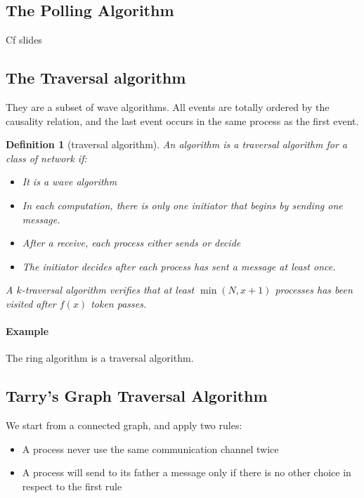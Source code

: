 \documentclass{article}
\newtheorem{defi}{Definition}
\begin{document}
\newpage
\subsection{The Polling Algorithm}
Cf slides


\subsection{The Traversal algorithm}
They are a subset of wave algorithms. All events are totally ordered by the causality relation, and the last event occurs in the same process as the first event.

\begin{defi}[traversal algorithm]
An algorithm is a traversal algorithm for a class of network if:
\begin{itemize}[noitemsep]
\item It is a wave algorithm
\item In each computation, there is only one initiator that begins by sending one message.
\item After a receive, each process either sends or decide
\item The initiator decides after each process has sent a message at least once.
\end{itemize}
A $k$-traversal algorithm verifies that at least $\min(N,x+1)$ processes has been visited after $f(x)$ token passes.
\end{defi}

\paragraph{Example}
The ring algorithm is a traversal algorithm.

\subsection{Tarry's Graph Traversal Algorithm}
We start from a connected graph, and apply two rules:
\begin{itemize}[noitemsep]
\item A process never use the same communication channel twice 
\item A process will send to its father a message only if there is no other choice in respect to the first rule
\end{itemize}

\begin{algorithm}
\end{algorithm}
\end{document}
